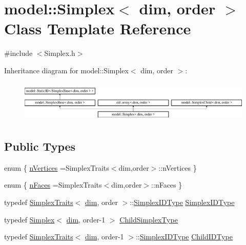 \hypertarget{classmodel_1_1_simplex}{}\section{model\+:\+:Simplex$<$ dim, order $>$ Class Template Reference}
\label{classmodel_1_1_simplex}


{\ttfamily \#include $<$Simplex.\+h$>$}

Inheritance diagram for model\+:\+:Simplex$<$ dim, order $>$\+:\begin{figure}[H]
\begin{center}
\leavevmode
\includegraphics[height=2.000000cm]{classmodel_1_1_simplex}
\end{center}
\end{figure}
\subsection*{Public Types}
\begin{DoxyCompactItemize}
\item 
enum \{ \hyperlink{classmodel_1_1_simplex_a7286fd954404dc7a5db4e651ca79f98ca92a060ca173e4145b92edcbdca5f0b97}{n\+Vertices} =Simplex\+Traits$<$dim,order$>$\+:\+:n\+Vertices
 \}
\item 
enum \{ \hyperlink{classmodel_1_1_simplex_a2b1d678a5e859ed6ba64f7b92f48d8faa6946a68a30619094b8c50c275212e598}{n\+Faces} =Simplex\+Traits$<$dim,order$>$\+:\+:n\+Faces
 \}
\item 
typedef \hyperlink{structmodel_1_1_simplex_traits}{Simplex\+Traits}$<$ \hyperlink{plot_nd_a_8m_a382f3ca768b275b8d563604f7fc7df73}{dim}, order $>$\+::\hyperlink{classmodel_1_1_simplex_a77f355697a218f3f31a38676ad6ff31d}{Simplex\+I\+D\+Type} \hyperlink{classmodel_1_1_simplex_a77f355697a218f3f31a38676ad6ff31d}{Simplex\+I\+D\+Type}
\item 
typedef \hyperlink{classmodel_1_1_simplex}{Simplex}$<$ \hyperlink{plot_nd_a_8m_a382f3ca768b275b8d563604f7fc7df73}{dim}, order-\/1 $>$ \hyperlink{classmodel_1_1_simplex_a46dfe21eca46643d60dca2f44f1a80fa}{Child\+Simplex\+Type}
\item 
typedef \hyperlink{structmodel_1_1_simplex_traits}{Simplex\+Traits}$<$ \hyperlink{plot_nd_a_8m_a382f3ca768b275b8d563604f7fc7df73}{dim}, order-\/1 $>$\+::\hyperlink{classmodel_1_1_simplex_a77f355697a218f3f31a38676ad6ff31d}{Simplex\+I\+D\+Type} \hyperlink{classmodel_1_1_simplex_a7b81b988588a5b1aa9d568d0ce2b1702}{Child\+I\+D\+Type}
\end{DoxyCompactItemize}
